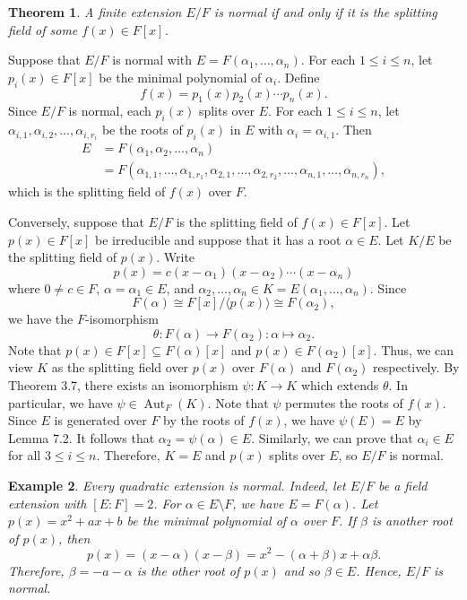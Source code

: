 \documentclass[10pt]{article}
\makeatletter
\DeclareMathOperator{\Aut}{Aut}
\theoremstyle{newstyle}
\newtheorem{thm}{Theorem}[section]
\newtheorem{exmp}[thm]{Example}
\newenvironment{pf}[1][\proofname]{\par
  \pushQED{\qed}%
  \normalfont \topsep0\p@\relax
  \trivlist
  \item[\hskip\labelsep\scshape
  #1\@addpunct{.}]\ignorespaces
}{%
  \popQED\endtrivlist\@endpefalse
}
\makeatother
\begin{document}
\begin{thm}
A finite extension $E/F$ is normal if and only if it is the splitting field of some $f(x) \in F[x]$. 
\end{thm}
\begin{pf}
Suppose that $E/F$ is normal with $E = F(\alpha_1, \dots, \alpha_n)$. For each $1 \leq i \leq n$, 
let $p_i(x) \in F[x]$ be the minimal polynomial of $\alpha_i$. Define 
\[ f(x) = p_1(x) p_2(x) \cdots p_n(x). \]
Since $E/F$ is normal, each $p_i(x)$ splits over $E$. For each $1 \leq i \leq n$, let 
$\alpha_{i,1}, \alpha_{i,2}, \dots, \alpha_{i,r_i}$ be the roots of $p_i(x)$ in $E$ with 
$\alpha_i = \alpha_{i,1}$. Then 
\begin{align*}
    E &= F(\alpha_1, \alpha_2, \dots, \alpha_n) \\
    &= F(\alpha_{1,1}, \dots, \alpha_{1,r_1}, \alpha_{2,1}, 
    \dots, \alpha_{2,r_2}, \dots, \alpha_{n,1}, \dots, \alpha_{n,r_n}), 
\end{align*}
which is the splitting field of $f(x)$ over $F$. 

Conversely, suppose that $E/F$ is the splitting field of $f(x) \in F[x]$. 
Let $p(x) \in F[x]$ be irreducible and suppose that it has a root $\alpha \in E$. 
Let $K/E$ be the splitting field of $p(x)$. Write 
\[ p(x) = c(x-\alpha_1)(x- \alpha_2) \cdots (x- \alpha_n) \]
where $0 \neq c \in F$, $\alpha = \alpha_1 \in E$, and $\alpha_2, \dots, \alpha_n \in K
= E(\alpha_1, \dots, \alpha_n)$. Since 
\[ F(\alpha) \cong F[x]/\langle p(x) \rangle \cong F(\alpha_2), \]
we have the $F$-isomorphism 
\[ \theta : F(\alpha) \to F(\alpha_2) : \alpha \mapsto \alpha_2. \]
Note that $p(x) \in F[x] \subseteq F(\alpha)[x]$ and $p(x) \in F(\alpha_2)[x]$. Thus, 
we can view $K$ as the splitting field over $p(x)$ over $F(\alpha)$ and 
$F(\alpha_2)$ respectively. By Theorem 3.7, there exists an isomorphism $\psi : K \to K$ 
which extends $\theta$. In particular, we have $\psi \in \Aut_F(K)$. 
Note that $\psi$ permutes the roots of $f(x)$. Since $E$ is generated over $F$ 
by the roots of $f(x)$, we have $\psi(E) = E$ by Lemma 7.2. It follows that 
$\alpha_2 = \psi(\alpha) \in E$. Similarly, we can prove that $\alpha_i \in E$ 
for all $3 \leq i \leq n$. Therefore, $K = E$ and $p(x)$ splits over $E$, so 
$E/F$ is normal. 
\end{pf}

\begin{exmp}
Every quadratic extension is normal. Indeed, let $E/F$ be a field extension with 
$[E : F] = 2$. For $\alpha \in E \setminus F$, we have $E = F(\alpha)$. 
Let $p(x) = x^2 + ax + b$ be the minimal polynomial of $\alpha$ over $F$. If 
$\beta$ is another root of $p(x)$, then 
\[ p(x) = (x-\alpha)(x-\beta) = x^2 - (\alpha+\beta)x + \alpha\beta. \]
Therefore, $\beta = -a-\alpha$ is the other root of $p(x)$ and so $\beta \in E$. 
Hence, $E/F$ is normal.
\end{exmp}
\end{document}

